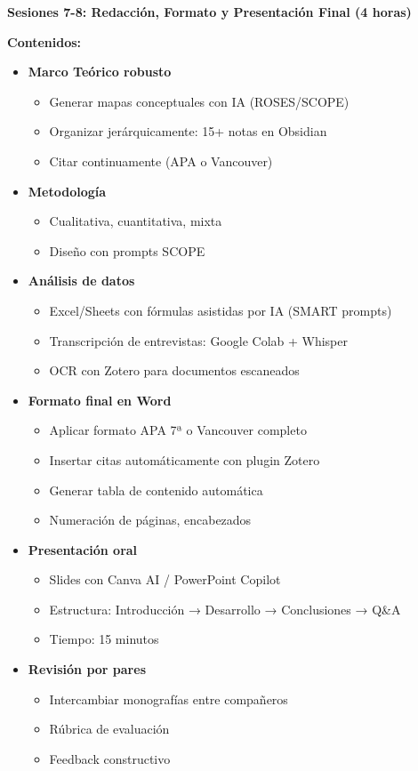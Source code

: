 \documentclass[12pt,a4paper]{yaac-luatex}
\newcommand{\subsecciontitulo}[1]{
	{\color{maincolor}\large\bfseries #1}
}
\begin{document}
	\begin{tcolorbox}[
		enhanced,
		colback=white,
		colframe=curso3color,
		arc=3pt,
		boxrule=1.5pt,
		left=10pt,
		right=10pt,
		top=8pt,
		bottom=8pt,
		breakable
		]
		\subsecciontitulo{Sesiones 7-8: Redacción, Formato y Presentación Final (4 horas)}
		
		\textbf{Contenidos:}
		\begin{itemize}[leftmargin=*, itemsep=0.1cm]
			\item \textbf{Marco Teórico robusto}
			\begin{itemize}
				\item Generar mapas conceptuales con IA (ROSES/SCOPE)
				\item Organizar jerárquicamente: 15+ notas en Obsidian
				\item Citar continuamente (APA o Vancouver)
			\end{itemize}
			\item \textbf{Metodología}
			\begin{itemize}
				\item Cualitativa, cuantitativa, mixta
				\item Diseño con prompts SCOPE
			\end{itemize}
			\item \textbf{Análisis de datos}
			\begin{itemize}
				\item Excel/Sheets con fórmulas asistidas por IA (SMART prompts)
				\item Transcripción de entrevistas: Google Colab + Whisper
				\item OCR con Zotero para documentos escaneados
			\end{itemize}
			\item \textbf{Formato final en Word}
			\begin{itemize}
				\item Aplicar formato APA 7ª o Vancouver completo
				\item Insertar citas automáticamente con plugin Zotero
				\item Generar tabla de contenido automática
				\item Numeración de páginas, encabezados
			\end{itemize}
			\item \textbf{Presentación oral}
			\begin{itemize}
				\item Slides con Canva AI / PowerPoint Copilot
				\item Estructura: Introducción → Desarrollo → Conclusiones → Q\&A
				\item Tiempo: 15 minutos
			\end{itemize}
			\item \textbf{Revisión por pares}
			\begin{itemize}
				\item Intercambiar monografías entre compañeros
				\item Rúbrica de evaluación
				\item Feedback constructivo
			\end{itemize}
		\end{itemize}
		

\end{tcolorbox}
\end{document}
